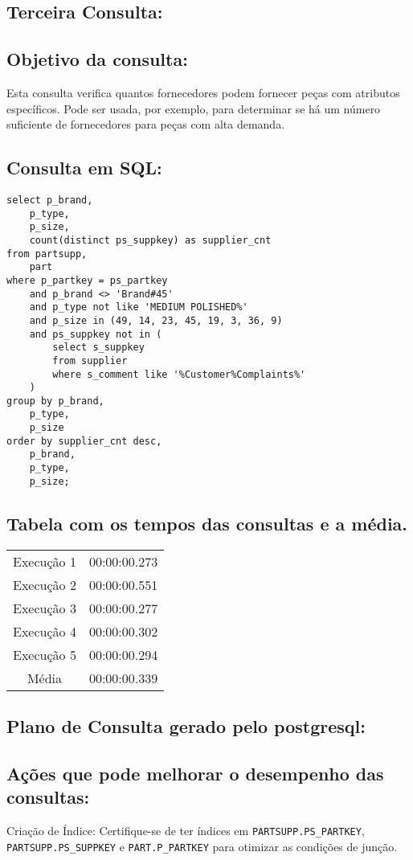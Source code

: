 \documentclass[12pt]{article}
\begin{document}
\begin{landscape}
\section{Terceira Consulta:}


\subsection{Objetivo da consulta:}
Esta consulta verifica quantos fornecedores podem fornecer peças com atributos específicos. Pode ser usada, por exemplo, para determinar se há um número suficiente de fornecedores para peças com alta demanda.

\subsection{Consulta em SQL:}
\begin{lstlisting}
select p_brand,
	p_type,
	p_size,
	count(distinct ps_suppkey) as supplier_cnt
from partsupp,
	part
where p_partkey = ps_partkey
	and p_brand <> 'Brand#45'
	and p_type not like 'MEDIUM POLISHED%'
	and p_size in (49, 14, 23, 45, 19, 3, 36, 9)
	and ps_suppkey not in (
		select s_suppkey
		from supplier
		where s_comment like '%Customer%Complaints%'
	)
group by p_brand,
	p_type,
	p_size
order by supplier_cnt desc,
	p_brand,
	p_type,
	p_size;
\end{lstlisting}

\subsection{Tabela com os tempos das consultas e a média.}
\begin{tabular}{|c|c|}
  \hline
  Execução 1 & 00:00:00.273 \\
  Execução 2 & 00:00:00.551 \\
  Execução 3 & 00:00:00.277 \\
  Execução 4 & 00:00:00.302 \\
  Execução 5 & 00:00:00.294 \\
  \hline
  Média & 00:00:00.339 \\
  \hline
\end{tabular}

\subsection{Plano de Consulta gerado pelo postgresql:}

\subsection{Ações que pode melhorar o desempenho das 
consultas:} Criação de Índice: Certifique-se de ter índices em \texttt{PARTSUPP.PS\_PARTKEY}, \texttt{PARTSUPP.PS\_SUPPKEY} e \texttt{PART.P\_PARTKEY} para otimizar as condições de junção.

\end{landscape}
\end{document}
